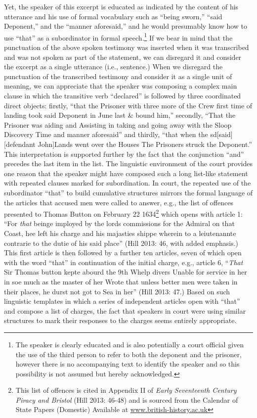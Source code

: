 \begin{styleStandard}
Yet, the speaker of this excerpt is educated as indicated by the content of his utterance and his use of formal vocabulary such as “being sworn,” “said Deponent,” and the “manner aforesaid,” and he would presumably know how to use “that” as a subordinator in formal speech.\footnote{ The speaker is clearly educated and is also potentially a court official given the use of the third person to refer to both the deponent and the prisoner, however there is no accompanying text to identify the speaker and so this possibility is not assumed but hereby acknowledged.} If we bear in mind that the punctuation of the above spoken testimony was inserted when it was transcribed and was not spoken as part of the statement, we can disregard it and consider the excerpt as a single utterance (i.e., sentence.) When we disregard the punctuation of the transcribed testimony and consider it as a single unit of meaning, we can appreciate that the speaker was composing a complex main clause in which the transitive verb “declared” is followed by three coordinated direct objects: firstly, “that\textit{ }the Prisoner with three more of the Crew first time of landing took said Deponent in June last \& bound him,” secondly, “That the Prisoner was aiding and Assisting in taking and going away with the Sloop Discovery Time and manner aforesaid” and thirdly, “that when the sd[said] [defendant John]Lands went over the Houses The Prisoners struck the Deponent.” This interpretation is supported further by the fact that the conjunction “and” precedes the last item in the list. The linguistic environment of the court provides one reason that the speaker might have composed such a long list-like statement with repeated clauses marked for subordination. In court, the repeated use of the subordinator “that” to build cumulative structures mirrors the formal language of the articles that accused men were called to answer, e.g., the list of offences presented to Thomas Button on February 22 1634\footnote{ This list of offences is cited in Appendix II of \textit{Early Seventeenth Century Piracy and Bristol} (Hill 2013: 46-48) and is sourced from the Calendar of State Papers (Domestic) Available at \href{http://www.british-history.ac.uk}{www.british-history.ac.uk}\par } which opens with article 1: “For\textit{ that} beinge imployed by the lords commissions for the Admiral on that Coast, hee left his charge and his majasties shippe wherein to a leiutenannte contrarie to the dutie of his said place” (Hill 2013: 46, with added emphasis.) This first article is then followed by a further ten articles, seven of which open with the word “that” in continuation of the initial charge, e.g., article 6, “\textit{That }Sir Thomas button kepte abourd the 9th Whelp divers Unable for service in her in soe much as the master of her Wrote that unless better men were taken in their places, he durst not got to Sea in her” (Hill 2013: 47.) Based on such linguistic templates in which a series of independent articles open with “that” and compose a list of charges, the fact that speakers in court were using similar structures to mark their responses to the charges seems entirely appropriate. 
\end{styleStandard}
